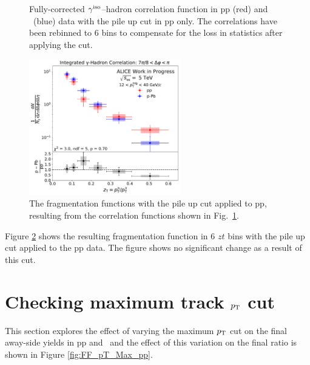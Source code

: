 \begin{figure}
\caption{Fully-corrected $\gamma^\mathrm{iso}$--hadron correlation function in pp (red) and \pPb~(blue) data with the pile up cut in pp only. The correlations have been rebinned to 6 \zt bins to compensate for the loss in statistics after applying the cut.}
\label{fig:Correlation_pileup}
\end{figure}

\begin{figure}[hbtp]
\centering
\includegraphics[width=0.59\textwidth]{G-H_New/zT_Rebin_6_006zT06zTpileCut/Final_FFunction_and_Ratio.pdf}
\caption{The fragmentation functions with the pile up cut applied to pp, resulting from the correlation functions shown in Fig.~\ref{fig:Correlation_pileup}.}
\label{fig:FF_pileup}
\end{figure}


Figure \ref{fig:FF_pileup} shows the resulting fragmentation function in 6 $zt$ bins with the pile up cut applied to the pp data. The figure shows no significant change as a result of this cut.


\section{Checking maximum track $p_{\mathrm{T}}$ cut}
This section explores the effect of varying the maximum $p_{\mathrm{T}}$ cut on the final away-side yields in pp and \pPb~and the effect of this variation on the final ratio is shown in Figure \ref{fig:FF_pT_Max_pp}.


